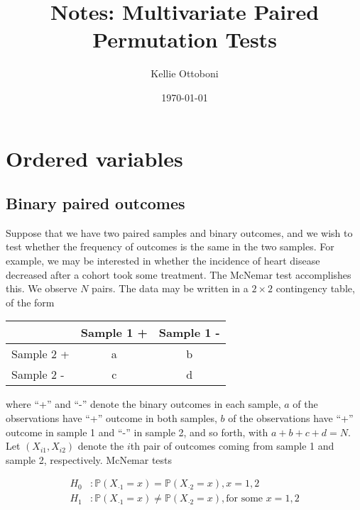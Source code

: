 \documentclass[12pt]{article}
\title{Notes: Multivariate Paired Permutation Tests}
\author{Kellie Ottoboni}
\date{\today}
\newcommand{\pr}{\mathbb{P}} %
\begin{document}
\maketitle







\section{Ordered variables}
\subsection{Binary paired outcomes}
Suppose that we have two paired samples and binary outcomes, and we wish to test whether the frequency of outcomes is the same in the two samples.
For example, we may be interested in whether the incidence of heart disease decreased after a cohort took some treatment.
The McNemar test accomplishes this.
We observe $N$ pairs.
The data may be written in a $2 \times 2$ contingency table, of the form

\begin{table}[h]
\begin{tabular}{|l|c|c|}
\hline
 & Sample 1 + & Sample 1 - \\
 \hline
 Sample 2 + & a & b \\
 \hline 
 Sample 2 - & c & d \\
 \hline
\end{tabular}
\end{table}
where ``+'' and ``-'' denote the binary outcomes in each sample,
$a$ of the observations have ``+'' outcome in both samples,
$b$ of the observations have ``+'' outcome in sample 1 and ``-'' in sample 2, and so forth,
with $a + b + c + d = N$. \\

Let $(X_{i1}, X_{i2})$ denote the $i$th pair of outcomes coming from sample 1 and sample 2, respectively.
McNemar tests

\begin{align*}
H_0&: \pr(X_{\cdot 1} = x) =  \pr(X_{\cdot 2} = x), x = 1, 2 \\
H_1&: \pr(X_{\cdot 1}  = x) \neq  \pr(X_{\cdot 2}  = x), \text{for some } x = 1, 2 
\end{align*}
\end{document}
